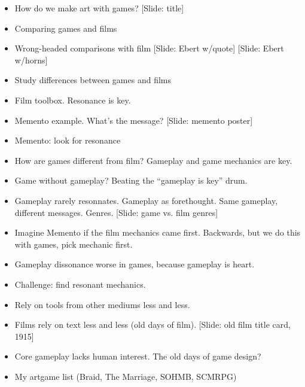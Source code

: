 \documentclass[12pt]{article}
\begin{document}
{\Huge

\begin{itemize}

\item How do we make art with games? [Slide: title]

\item Comparing games and films

\item Wrong-headed comparisons with film [Slide: Ebert w/quote] [Slide: Ebert w/horns]

\item Study differences between games and films

\item Film toolbox.  Resonance is key.

\item Memento example.  What's the message?  [Slide:  memento poster]

\item Memento:  look for resonance

\item How are games different from film?  Gameplay and game mechanics are key.

\item Game without gameplay?  Beating the ``gameplay is key'' drum.

\item Gameplay rarely resonnates.  Gameplay as forethought.  Same gameplay, different messages.  Genres.  [Slide:  game vs. film genres]

\item Imagine Memento if the film mechanics came first.  Backwards, but we do this with games, pick mechanic first.

\item Gameplay dissonance worse in games, because gameplay is heart.

\item Challenge:  find resonant mechanics.

\item Rely on tools from other mediums less and less.

\item Films rely on text less and less (old days of film).  [Slide:  old film title card, 1915]
 
\item Core gameplay lacks human interest.  The old days of game design?
 
\item My artgame list (Braid, The Marriage, SOHMB, SCMRPG)
 

\end{itemize}}
\end{document}
